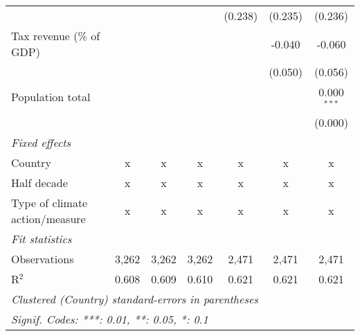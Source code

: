 \begin{tabular}{lcccccc}
                                                      &         &               &                & (0.238)        & (0.235)        & (0.236)\\   
   Tax revenue (\% of GDP)                            &         &               &                &                & -0.040         & -0.060\\   
                                                      &         &               &                &                & (0.050)        & (0.056)\\   
   Population total                                   &         &               &                &                &                & 0.000$^{***}$\\   
                                                      &         &               &                &                &                & (0.000)\\   
   \emph{Fixed effects}\\
   Country                                            & x       & x             & x              & x              & x              & x\\  
   Half decade                                        & x       & x             & x              & x              & x              & x\\  
   Type of climate action/measure                     & x       & x             & x              & x              & x              & x\\  
   \midrule \emph{Fit statistics}\\
   Observations                                       & 3,262   & 3,262         & 3,262          & 2,471          & 2,471          & 2,471\\  
   R$^2$                                              & 0.608   & 0.609         & 0.610          & 0.621          & 0.621          & 0.621\\  
   \midrule
   \multicolumn{7}{l}{\emph{Clustered (Country) standard-errors in parentheses}}\\
   \multicolumn{7}{l}{\emph{Signif. Codes: ***: 0.01, **: 0.05, *: 0.1}}\\
\end{tabular}
\par\endgroup


